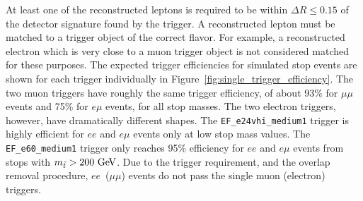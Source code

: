\begin{table}[ht]
  \caption[
    Trigger selection for each final state.
  ]{
    Trigger selection for each final state. If the event passes any of
    the triggers for the given final state, the event is accepted.
  }
  \label{tab:triggers}
\end{table}

At least one of the reconstructed leptons is required to be within 
$\Delta R \leq 0.15$ of the detector signature found by the trigger.
A reconstructed lepton must be matched to a trigger object of the correct flavor.
For example, a reconstructed electron which is very close to a muon trigger
object is not considered matched for these purposes.
The expected trigger efficiencies for simulated stop events are shown
for each trigger individually in Figure~\ref{fig:single_trigger_efficiency}.
The two muon triggers have roughly the same trigger efficiency, of about 93\% 
for $\mu\mu$ events and 75\% for $e\mu$ events, for all stop masses.
The two electron triggers, however, have dramatically different shapes.
The \texttt{EF\_e24vhi\_medium1} trigger is highly efficient for $ee$ and
$e\mu$ events only at low stop mass values.
The \texttt{EF\_e60\_medium1} trigger only reaches 95\% efficiency for
$ee$ and $e\mu$ events from stops with $m_{\tilde{t}} > 200 \GeV$.
Due to the trigger requirement, and the overlap removal procedure,
$ee$~($\mu\mu$) events do not pass the single muon (electron) triggers.

